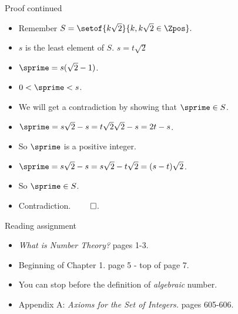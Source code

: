 \documentclass{beamer}
\begin{document}
\begin{frame}{Proof continued}

\begin{itemize}
  \item Remember $S=\setof{k\sqrt{2}}{k,k\sqrt{2}\in\Zpos}.$
  \item $s$ is the least element of $S$. $s=t\sqrt{2}$
  \item $\sprime = s(\sqrt{2} - 1)$.
  \item $0< \sprime<s$.
  \item We will get a contradiction by showing that $\sprime\in S$.
  \item $\sprime = s\sqrt{2} -s = t\sqrt{2}\sqrt{2} - s = 2t -s$.
  \item So $\sprime$ is a  positive integer.
  \item $\sprime = s\sqrt{2} -s = s\sqrt{2} - t\sqrt{2} = (s-t)\sqrt{2}$.
  \item So $\sprime\in S$.
  \item Contradiction. $\qed$.
\end{itemize}

\end{frame}

\begin{frame}{Reading assignment}

\begin{itemize}
  \item \emph{What is Number Theory?} pages 1-3.
  \item Beginning of Chapter 1. page 5 - top of page 7.
  \item You can stop before the definition of \emph{algebraic} number.
  \item Appendix A: \emph{Axioms for the Set of Integers.} pages 605-606.
\end{itemize}

\end{frame}
\end{document}
